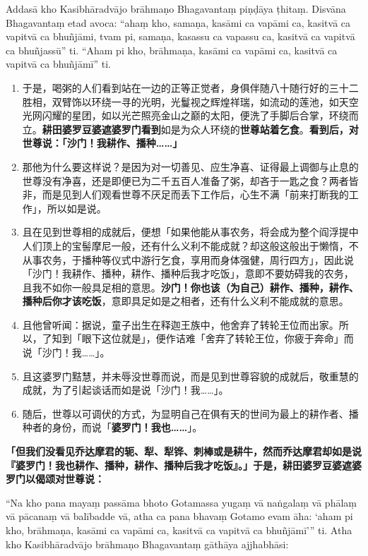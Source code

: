 Addasā kho Kasibhāradvājo brāhmaṇo Bhagavantaṃ piṇḍāya ṭhitaṃ. Disvāna Bhagavantaṃ etad avoca: “ahaṃ kho, samaṇa, kasāmi ca vapāmi ca, kasitvā ca vapitvā ca bhuñjāmi, tvam pi, samaṇa, kasassu ca vapassu ca, kasitvā ca vapitvā ca bhuñjassū” ti. “Aham pi kho, brāhmaṇa, kasāmi ca vapāmi ca, kasitvā ca vapitvā ca bhuñjāmī” ti.

\begin{enumerate}\item 于是，喝粥的人们看到站在一边的正等正觉者，身俱伴随八十随行好的三十二胜相，双臂饰以环绕一寻的光明，光鬘视之辉煌祥瑞，如流动的莲池，如天空光网闪耀的星团，如以光芒照亮金山之巅的太阳，便洗了手脚后合掌，环绕而立。\textbf{耕田婆罗豆婆遮婆罗门看到}如是为众人环绕的\textbf{世尊站着乞食}。\textbf{看到后，对世尊说：「沙门！我耕作、播种……」}
\item 那他为什么要这样说？是因为对一切善见、应生净喜、证得最上调御与止息的世尊没有净喜，还是即便已为二千五百人准备了粥，却吝于一匙之食？两者皆非，而是见到人们观看世尊不厌足而丢下工作后，心生不满「前来打断我的工作」，所以如是说。
\item 且在见到世尊相的成就后，便想「如果他能从事农务，将会成为整个阎浮提中人们顶上的宝髻摩尼一般，还有什么义利不能成就？却这般这般出于懒惰，不从事农务，于播种等仪式中游行乞食，享用而身体强健，周行四方」，因此说「沙门！我耕作、播种，耕作、播种后我才吃饭」，意即不要妨碍我的农务，且我不如你一般具足相的意思。\textbf{沙门！你也该（为自己）耕作、播种，耕作、播种后你才该吃饭}，意即具足如是之相者，还有什么义利不能成就的意思。
\item 且他曾听闻：据说，童子出生在释迦王族中，他舍弃了转轮王位而出家。所以，了知到「眼下这位就是」，便作诘难「舍弃了转轮王位，你疲于奔命」而说「沙门！我……」。
\item 且这婆罗门黠慧，并未辱没世尊而说，而是见到世尊容貌的成就后，敬重慧的成就，为了引起谈话而如是说「沙门！我……」。
\item 随后，世尊以可调伏的方式，为显明自己在俱有天的世间为最上的耕作者、播种者的身份，而说「\textbf{婆罗门！我也……}」。\end{enumerate}

\textbf{「但我们没看见乔达摩君的轭、犁、犁铧、刺棒或是耕牛，然而乔达摩君却如是说『婆罗门！我也耕作、播种，耕作、播种后我才吃饭』。」于是，耕田婆罗豆婆遮婆罗门以偈颂对世尊说：}

“Na kho pana mayaṃ passāma bhoto Gotamassa yugaṃ vā naṅgalaṃ vā phālaṃ vā pācanaṃ vā balībadde vā, atha ca pana bhavaṃ Gotamo evam āha: ‘aham pi kho, brāhmaṇa, kasāmi ca vapāmi ca, kasitvā ca vapitvā ca bhuñjāmī’” ti. Atha kho Kasibhāradvājo brāhmaṇo Bhagavantaṃ gāthāya ajjhabhāsi:

